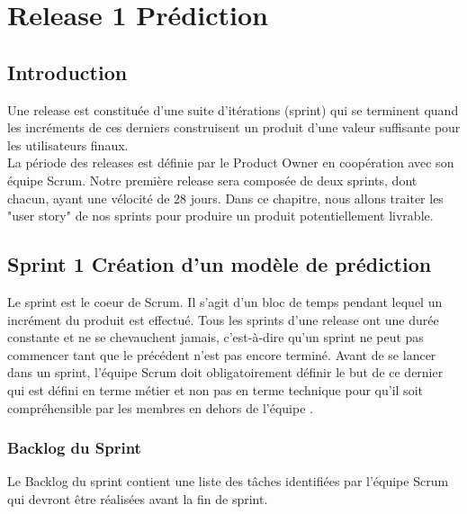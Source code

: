 \chapter{Release 1 Prédiction}
\section*{Introduction}
Une release est constituée d’une suite d’itérations (sprint) qui se terminent quand les incréments de ces derniers
construisent un produit d'une valeur suffisante pour les utilisateurs finaux.\\
La période des releases est définie par le Product Owner en coopération avec son équipe Scrum.
Notre première release sera composée de deux sprints, dont chacun, ayant une vélocité de 28 jours.
Dans ce chapitre, nous allons traiter les "user story" de nos sprints pour produire un produit
potentiellement livrable.
\section{Sprint 1 Création d'un modèle de prédiction}
Le sprint est le coeur de Scrum. Il s’agit d’un bloc de temps pendant lequel un incrément du produit est effectué. Tous les sprints d’une release ont une durée constante et ne se chevauchent
jamais, c’est-à-dire qu’un sprint ne peut pas commencer tant que le précédent n’est pas encore terminé.
Avant de se lancer dans un sprint, l’équipe Scrum doit obligatoirement définir le but de ce dernier qui est défini en terme métier et non pas en terme technique pour qu’il soit compréhensible par les membres en dehors de l’équipe \cite{sprint}.

\subsection{Backlog du Sprint}
Le Backlog du sprint contient une liste des tâches identifiées par l'équipe Scrum qui devront être réalisées avant la fin de sprint.\\


